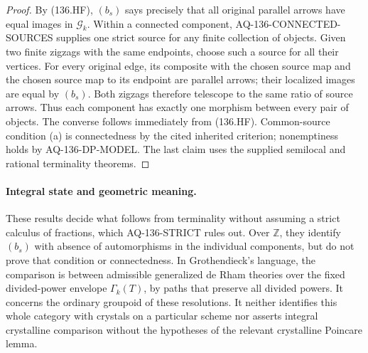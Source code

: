 \begin{proof}
By (136.HF), $(b_s)$ says precisely that all original parallel
arrows have equal images in $\mathcal G_k$.  Within a connected
component, AQ-136-CONNECTED-SOURCES supplies one strict source for
any finite collection of objects.  Given two finite zigzags with
the same endpoints, choose such a source for all their vertices.
For every original edge, its composite with the chosen source map
and the chosen source map to its endpoint are parallel arrows;
their localized images are equal by $(b_s)$.  Both zigzags therefore
telescope to the same ratio of source arrows.  Thus each component
has exactly one morphism between every pair of objects.  The
converse follows immediately from (136.HF).  Common-source
condition (a) is connectedness by the cited inherited criterion;
nonemptiness holds by AQ-136-DP-MODEL.  The last claim uses the
supplied semilocal and rational terminality theorems.
\end{proof}

\paragraph{Integral state and geometric meaning.}
These results decide what follows from terminality without assuming
a strict calculus of fractions, which AQ-136-STRICT rules out.
Over $\mathbb Z$, they identify $(b_s)$ with absence of automorphisms
in the individual components, but do not prove that condition or
connectedness.  In Grothendieck's language, the comparison is between
admissible generalized de Rham theories over the fixed divided-power
envelope $\Gamma_k(T)$, by paths that preserve all divided powers.
It concerns the ordinary groupoid of these resolutions.  It neither
identifies this whole category with crystals on a particular scheme
nor asserts integral crystalline comparison without the hypotheses
of the relevant crystalline Poincare lemma.
